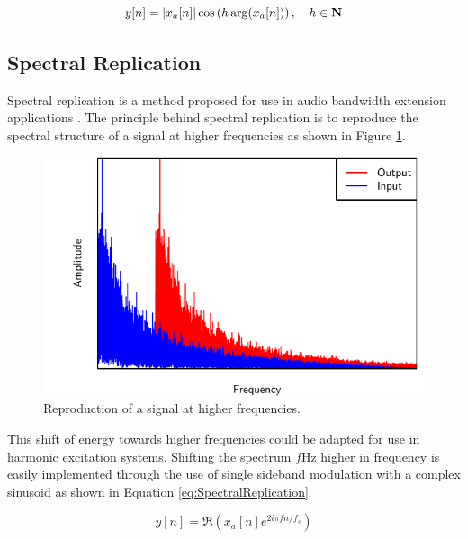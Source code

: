 		\begin{equation}
			y[n] = \left|x_{a}[n]\right| \cos \left( h\arg(x_{a}[n]) \right), \quad h \in \textbf{N}
			\label{eq:IAP}
		\end{equation}

	\subsection{Spectral Replication}
	\label{sec:Excitation-Methods-SpectralReplication}
		Spectral replication is a method proposed for use in audio bandwidth extension applications
		\citep{nagel2010a}. The principle behind spectral replication is to reproduce the spectral structure of a
		signal at higher frequencies as shown in Figure \ref{fig:SpectralReplication}.

		\begin{figure}[h!]
			\centering
			\includegraphics{chapter3/Images/SpectralReplicationSpectrum.pdf}
			\caption{Reproduction of a signal at higher frequencies.}
			\label{fig:SpectralReplication}
		\end{figure}

		This shift of energy towards higher frequencies could be adapted for use in harmonic excitation systems.
		Shifting the spectrum $f$Hz higher in frequency is easily implemented through the use of single sideband
		modulation with a complex sinusoid as shown in Equation \ref{eq:SpectralReplication}.

		\begin{equation}
			y[n] = \Re \left( x_{a}[n] e^{2i\pi fn/ f_{s}} \right)
			\label{eq:SpectralReplication}
		\end{equation}

